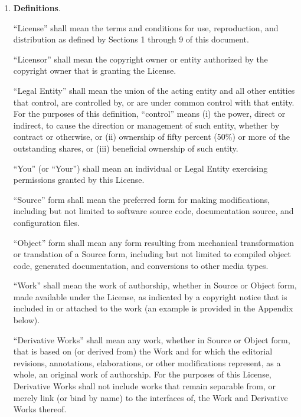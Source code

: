 \documentclass{pracamgr}
\begin{document}
\begin{enumerate}

\item \textbf{Definitions}.

  ``License'' shall mean the terms and conditions for use, reproduction,
  and distribution as defined by Sections 1 through 9 of this
  document.

  ``Licensor'' shall mean the copyright owner or entity authorized by
  the copyright owner that is granting the License.

  ``Legal Entity'' shall mean the union of the acting entity and all
  other entities that control, are controlled by, or are under common
  control with that entity. For the purposes of this definition,
  ``control'' means (i) the power, direct or indirect, to cause the
  direction or management of such entity, whether by contract or
  otherwise, or (ii) ownership of fifty percent (50\%) or more of the
  outstanding shares, or (iii) beneficial ownership of such entity.

  ``You'' (or ``Your'') shall mean an individual or Legal Entity
  exercising permissions granted by this License.

  ``Source'' form shall mean the preferred form for making
  modifications, including but not limited to software source code,
  documentation source, and configuration files.

  ``Object'' form shall mean any form resulting from mechanical
  transformation or translation of a Source form, including but not
  limited to compiled object code, generated documentation, and
  conversions to other media types.

  ``Work'' shall mean the work of authorship, whether in Source or
  Object form, made available under the License, as indicated by a
  copyright notice that is included in or attached to the work (an
  example is provided in the Appendix below).

  ``Derivative Works'' shall mean any work, whether in Source or Object
  form, that is based on (or derived from) the Work and for which the
  editorial revisions, annotations, elaborations, or other
  modifications represent, as a whole, an original work of
  authorship. For the purposes of this License, Derivative Works shall
  not include works that remain separable from, or merely link (or
  bind by name) to the interfaces of, the Work and Derivative Works
  thereof.


\end{enumerate}
\end{document}
